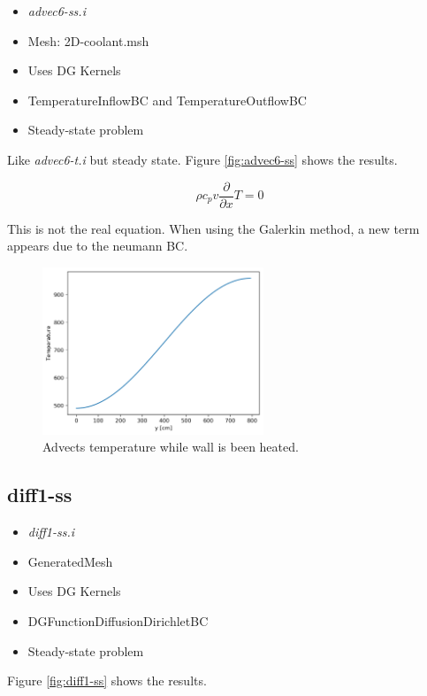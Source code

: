 \documentclass[11pt,letterpaper]{article}
\begin{document}
	\begin{itemize}
		\item \textit{advec6-ss.i}
		\item Mesh: 2D-coolant.msh
		\item Uses DG Kernels
		\item TemperatureInflowBC and TemperatureOutflowBC
		\item Steady-state problem
	\end{itemize}

    Like \textit{advec6-t.i} but steady state.
    Figure \ref{fig:advec6-ss} shows the results.

	\begin{equation}
    \rho c_p v \frac{\partial}{\partial x} T = 0
	\end{equation}

	This is not the real equation. When using the Galerkin method, a new term appears due to the neumann BC.

	\begin{figure}[htbp!]
		\centering
		\includegraphics[height=5cm]{advec6-ss}
		\caption{Advects temperature while wall is been heated.}
		\label{fig:advec6-t}
	\end{figure}

	\subsection{diff1-ss}

	\begin{itemize}
		\item \textit{diff1-ss.i}
		\item GeneratedMesh
		\item Uses DG Kernels
		\item DGFunctionDiffusionDirichletBC
		\item Steady-state problem
	\end{itemize}

    Figure \ref{fig:diff1-ss} shows the results.
\end{document}
